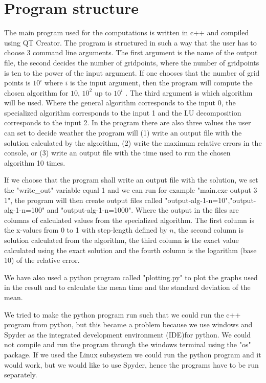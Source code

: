 \documentclass[10pt]{article}
\begin{document}
\section{Program structure}
The main program used for the computations is written in c++ and compiled using QT Creator. The program is structured in such a way that the user has to choose 3 command line arguments. The first argument is the name of the output file, the second decides the number of gridpoints, where the number of gridpoints is ten to the power of the input argument. If one chooses that the number of grid points is $10^i$ where $i$ is the input argument, then the program will compute the chosen algorithm for $10$, $10^2$ up to $10^i$ . The third argument is which algorithm will be used. Where the general algorithm corresponds to the input 0, the specialized algorithm corresponds to the input 1 and the LU decomposition corresponds to the input 2. In the program there are also three values the user can set to decide weather the program will (1) write an output file with the solution calculated by the algorithm, (2) write the maximum relative errors in the console, or (3) write an output file with the time used to run the chosen algorithm 10 times. 

If we choose that the program shall write an output file with the solution, we set the "write\_out" variable equal 1 and we can run for example "main.exe output 3 1", the program will then create output files called "output-alg-1-n=10","output-alg-1-n=100" and "output-alg-1-n=1000". Where the output in the files are columns of calculated values from the specialized algorithm. The first column is the x-values from 0 to 1 with step-length defined by $n$, the second column is solution calculated from the algorithm, the third column is the exact value calculated using the exact solution and the fourth column is the logarithm (base 10) of the relative error. 

We have also used a python program called "plotting.py" to plot the graphs used in the result and to calculate the mean time and the standard deviation of the mean.

We tried to make the python program run such that we could run the c++ program from python, but this became a problem because we use windows and Spyder as the integrated development environment (IDE)for python. We could not compile and run the program through the windows terminal using the "os" package. If we used the Linux subsystem we could run the python program and it would work, but we would like to use Spyder, hence the programs have to be run separately. 
\end{document}
